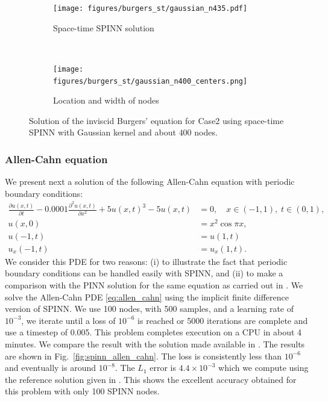 \documentclass[12pt]{article}
\newcommand{\rr}[1]{#1}
\newcommand{\rR}[1]{#1}
\begin{document}
\begin{figure}
\centering
\begin{subfigure}{0.45\textwidth}
\texttt{[image: figures/burgers\_st/gaussian\_n435.pdf]}
\caption{Space-time SPINN solution}
\label{fig:spinn_burgers_a}
\end{subfigure}
~
\begin{subfigure}{0.5\textwidth}
\texttt{[image: figures/burgers\_st/gaussian\_n400\_centers.png]}
\caption{Location and width of nodes}
\label{fig:spinn_burgers_b}
\end{subfigure}
\caption{Solution of the inviscid Burgers' equation for Case2 using space-time SPINN with Gaussian kernel and about $400$ nodes.}
\label{fig:spinn_burgers}
\end{figure}

\subsubsection{Allen-Cahn equation}
\label{subsec:allencahn}

\rr{
We present next a solution of the following Allen-Cahn equation with periodic boundary conditions:
\begin{equation} \label{eq:allen_cahn}
\begin{split}
\frac{\partial u(x,t)}{\partial t} - 0.0001\frac{\partial^2 u(x,t)}{\partial x^2} + 5u(x,t)^3 - 5u(x,t) & = 0, \quad x \in (-1,1), \; t \in (0,1),\\
u(x,0) &= x^2 \cos \pi x,\\
u(-1,t) &= u(1,t)\\
u_x(-1,t) &= u_x(1,t).
\end{split}
\end{equation}
We consider this PDE for two reasons: (i) to illustrate the fact that periodic boundary conditions can be handled easily with SPINN, and (ii) to make a comparison with the PINN solution for the same equation as carried out in \cite{RPK2019}. We solve the Allen-Cahn PDE \eqref{eq:allen_cahn} using the implicit finite difference version of SPINN. We use 100 nodes, with 500 samples, and a learning rate of $10^{-3}$, we iterate until a loss of $10^{-6}$ is reached or 5000 iterations are complete and use a timestep of 0.005. This problem completes execution on a CPU in about 4 minutes. We compare the result with the solution made available in \cite{RPK2019}. The results are shown in Fig.~\ref{fig:spinn_allen_cahn}.  The loss is consistently less than $10^{-6}$ and eventually is around $10^{-8}$.} \rR{The $L_1$ error is $4.4 \times 10^{-3}$ which we compute using the reference solution given in \cite{RPK2019}. } \rr{This shows the excellent accuracy obtained for this problem with only 100 SPINN nodes.}
\end{document}
